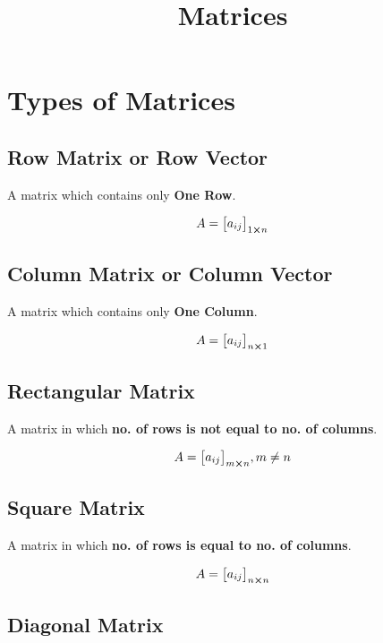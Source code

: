 \documentclass{article}
\title{Matrices}
\author{}
\date{}
\begin{document}
\maketitle

\section{Types of Matrices}

\subsection{Row Matrix or Row Vector}

A matrix which contains only \textbf{One Row}.

$$A= {\begin{bmatrix}
        a_{ij}
    \end{bmatrix}}_{1 \cross n}$$

\subsection{Column Matrix or Column Vector}

A matrix which contains only \textbf{One Column}.

$$A={\begin{bmatrix}
        a_{ij}
    \end{bmatrix}}_{n \cross 1} $$

\subsection{Rectangular Matrix}

A matrix in which \textbf{no. of rows is not equal to no. of columns}.

$$A={\begin{bmatrix}
        a_{ij}
    \end{bmatrix} }_{m \cross n}, m \not= n $$

\subsection{Square Matrix}

A matrix in which \textbf{no. of rows is equal to no. of columns}.

$$A={\begin{bmatrix}
        a_{ij}
    \end{bmatrix}}_{n \cross n} $$

\subsection{Diagonal Matrix}
\end{document}
